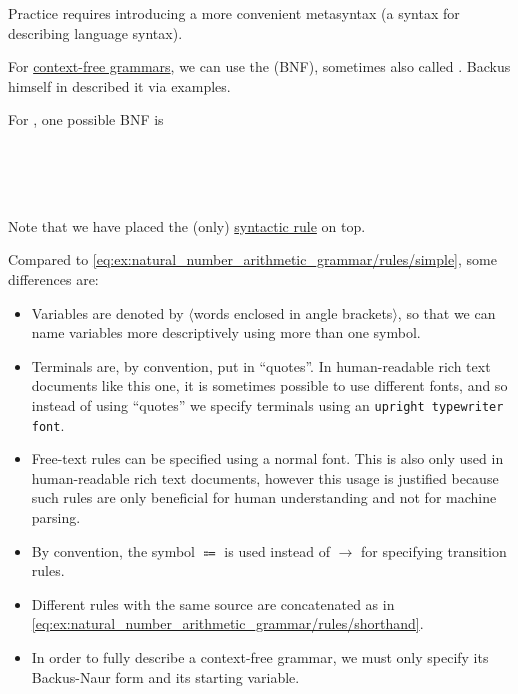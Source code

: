 \begin{remark}\label{rem:backus_normal_form}
  Practice requires introducing a more convenient metasyntax (a syntax for describing language syntax).

  For \hyperref[def:chomsky_hierarchy/context_free]{context-free grammars}, we can use the  (BNF), sometimes also called . Backus himself in \cite[14]{Backus1958} described it via examples.

  For , one possible BNF is
  \begin{bnf*}
         { \bnfor \bnfts{(} \bnfsp {} \bnfsp {} \bnfsp {} \bnfsp \bnfts{)}} \\
             { \bnfor {} \bnfor {} \bnfsp {}} \\
     { \bnfor {} \bnfsp {} \bnfor {} \bnfor {} \bnfsp {}} \\
          {\bnfts{\( + \)} \bnfor \bnfts{\( \times \)}}
  \end{bnf*}

  Note that we have placed the (only) \hyperref[rem:abstract_syntax_tree/syntactic]{syntactic rule} on top.

  Compared to \eqref{eq:ex:natural_number_arithmetic_grammar/rules/simple}, some differences are:
  \begin{itemize}
    \item Variables are denoted by \( \langle \)words enclosed in angle brackets\( \rangle \), so that we can name variables more descriptively using more than one symbol.
    \item Terminals are, by convention, put in \enquote{quotes}. In human-readable rich text documents like this one, it is sometimes possible to use different fonts, and so instead of using \enquote{quotes} we specify terminals using an \texttt{upright typewriter font}.
    \item Free-text rules can be specified using a normal font. This is also only used in human-readable rich text documents, however this usage is justified because such rules are only beneficial for human understanding and not for machine parsing.
    \item By convention, the symbol \( \Coloneqq \) is used instead of \( \to \) for specifying transition rules.
    \item Different rules with the same source are concatenated as in \eqref{eq:ex:natural_number_arithmetic_grammar/rules/shorthand}.
    \item In order to fully describe a context-free grammar, we must only specify its Backus-Naur form and its starting variable.
  \end{itemize}
\end{remark}
